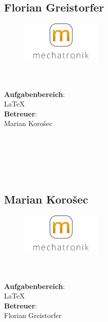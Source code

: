 \subsection*{Florian Greistorfer}
\begin{figure}
\begin{center}
  \includegraphics[width=0.35\textwidth]{logoMecha}
\end{center}
\end{figure}
\mbox{}\\
\mbox{}\\
\textbf{Aufgabenbereich}:\\
\LaTeX{}\\
\textbf{Betreuer}:\\
Marian Korošec
\mbox{}\\
\mbox{}\\
\mbox{}\\
\mbox{}\\
\mbox{}\\
\mbox{}\\

\subsection*{Marian Korošec}
\begin{figure}
\begin{center}
  \includegraphics[width=0.35\textwidth]{LogoMecha}
\end{center}
\end{figure}
\mbox{}\\
\mbox{}\\
\textbf{Aufgabenbereich}:\\
\LaTeX{}\\
\textbf{Betreuer}:\\
Florian Greistorfer
\mbox{}\\
\mbox{}\\
\mbox{}\\
\mbox{}\\
\mbox{}\\
\newpage

